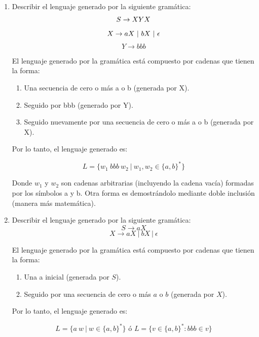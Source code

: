 \documentclass[12pt]{book} %
\begin{document}
\begin{enumerate}
\def\labelenumi{\alph{enumi})}
\item
  Describir el lenguaje generado por la siguiente gramática: \[
   S \to XYX \\
   \] \[
   X \to aX \ | \ bX \ | \ \epsilon \\
   \] \[
   Y \to bbb
   \]

  \begin{solucion}[Ejercicio 1.a]

   El lenguaje generado por la gramática está compuesto por cadenas que tienen la forma:

   \begin{enumerate}
       \item Una secuencia de cero o más a o b (generada por X).
       \item Seguido por bbb (generado por Y).
       \item Seguido nuevamente por una secuencia de cero o más a o b (generada por X).
   \end{enumerate}

   Por lo tanto, el lenguaje generado es:

   $$
   L = \{ w_1 \ bbb \ w_2 \ | \ w_1, w_2 \in \{a, b\}^* \}
   $$

   Donde $w_1$ y $w_2$ son cadenas arbitrarias (incluyendo la cadena vacía) formadas por los símbolos a y b. Otra forma es demostrándolo mediante doble inclusión (manera más matemática).

   \end{solucion}
\item
  Describir el lenguaje generado por la siguiente gramática: \[
   S \to aX 
   \] \[
   X \to aX \ | \ bX \ | \ \epsilon
   \]

  \begin{solucion}[Ejercicio 1.b]

   El lenguaje generado por la gramática está compuesto por cadenas que tienen la forma:

   \begin{enumerate}
       \item Una a inicial (generada por $S$).
       \item Seguido por una secuencia de cero o más $a$ o $b$ (generada por $X$).
   \end{enumerate}

   Por lo tanto, el lenguaje generado es:

   $$
   L = \{ a \ w \ | \ w \in \{a, b\}^* \} \text{ ó } L = \{v \in \{a,b\}^* : bbb \in v\}
   $$


\end{solucion}
\end{enumerate}
\end{document}
